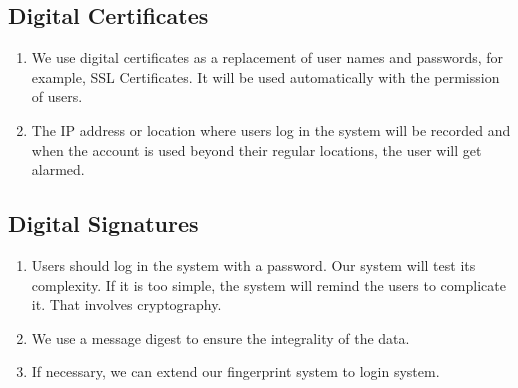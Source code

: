 \documentclass[12pt]{scrreprt}
\begin{document}
\subsection{Digital Certificates}
\begin{enumerate}
  \item We use digital certificates as a replacement of user names and
  passwords, for example, SSL Certificates. It will be used automatically
  with the permission of users.
  \item The IP address or location where users log in the system will be
  recorded and when the account is used beyond their regular locations, the
  user will get alarmed.
\end{enumerate}

\subsection{Digital Signatures}
\begin{enumerate}
  \item Users should log in the system with a password. Our system will
  test its complexity. If it is too simple, the system will remind the
  users to complicate it. That involves cryptography.
  \item We use a message digest to ensure the integrality of the data.
  \item If necessary, we can extend our fingerprint system to login system.
\end{enumerate}
\end{document}
